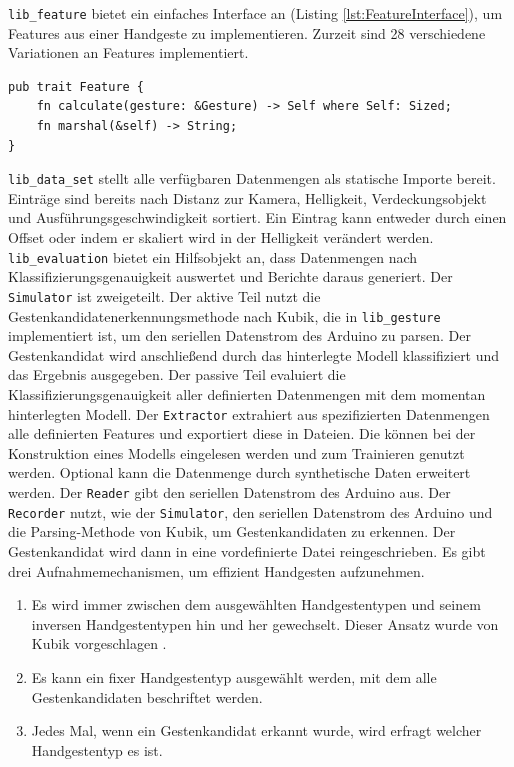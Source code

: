 \texttt{lib\_feature} bietet ein einfaches Interface an (Listing \ref{lst:FeatureInterface}), um Features aus einer Handgeste zu implementieren. Zurzeit sind 28 verschiedene Variationen an Features implementiert.
\begin{lstlisting}[label=lst:FeatureInterface,caption={Das Interface, um ein Feature zu implementieren.}]
pub trait Feature {
    fn calculate(gesture: &Gesture) -> Self where Self: Sized;
    fn marshal(&self) -> String;
}
\end{lstlisting}
\texttt{lib\_data\_set} stellt alle verfügbaren Datenmengen als statische Importe bereit. Einträge sind bereits nach Distanz zur Kamera, Helligkeit, Verdeckungsobjekt und Ausführungsgeschwindigkeit sortiert. Ein
Eintrag kann entweder durch einen Offset oder indem er skaliert wird in der Helligkeit verändert werden.
\newline
\newline
\texttt{lib\_evaluation} bietet ein Hilfsobjekt an, dass Datenmengen nach Klassifizierungsgenauigkeit auswertet und Berichte daraus generiert.
\newline
\newline
Der \texttt{Simulator} ist zweigeteilt. Der aktive Teil nutzt die Gestenkandidatenerkennungsmethode nach Kubik, die in \texttt{lib\_gesture} implementiert ist, um den seriellen Datenstrom des Arduino zu parsen. Der
Gestenkandidat wird anschließend durch das hinterlegte Modell klassifiziert und das Ergebnis ausgegeben. Der passive Teil evaluiert die Klassifizierungsgenauigkeit aller definierten Datenmengen mit dem momentan
hinterlegten Modell.
\newline
\newline
Der \texttt{Extractor} extrahiert aus spezifizierten Datenmengen alle definierten Features und exportiert diese in Dateien. Die können bei der Konstruktion eines Modells eingelesen werden und zum Trainieren
genutzt werden. Optional kann die Datenmenge durch synthetische Daten erweitert werden.
\newline
\newline
Der \texttt{Reader} gibt den seriellen Datenstrom des Arduino aus.
\newline
\newline
Der \texttt{Recorder} nutzt, wie der \texttt{Simulator}, den seriellen Datenstrom des Arduino und die Parsing-Methode von Kubik, um Gestenkandidaten zu erkennen.
Der Gestenkandidat wird dann in eine vordefinierte Datei reingeschrieben. Es gibt drei Aufnahmemechanismen, um effizient Handgesten aufzunehmen.
\begin{enumerate}
    \item Es wird immer zwischen dem ausgewählten Handgestentypen und seinem inversen Handgestentypen hin und her gewechselt. Dieser Ansatz wurde von Kubik vorgeschlagen \cite{venzkeArticle}.
    \item Es kann ein fixer Handgestentyp ausgewählt werden, mit dem alle Gestenkandidaten beschriftet werden.
    \item Jedes Mal, wenn ein Gestenkandidat erkannt wurde, wird erfragt welcher Handgestentyp es ist.
\end{enumerate}